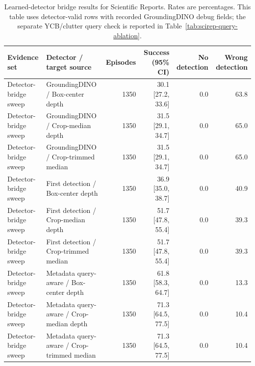\begin{table}[t]
\centering
\caption{Learned-detector bridge results for Scientific Reports. Rates are percentages. This table uses detector-valid rows with recorded GroundingDINO debug fields; the separate YCB/clutter query check is reported in Table~\ref{tab:scirep-query-ablation}.}
\label{tab:scirep-open-vocab-transfer}
\scriptsize
\begin{tabular}{llrrrr}
\toprule
Evidence set & Detector / target source & Episodes & Success (95\% CI) & No detection & Wrong detection \\
\midrule
Detector-bridge sweep & GroundingDINO / Box-center depth & 1350 & 30.1 [27.2, 33.6] & 0.0 & 63.8 \\
Detector-bridge sweep & GroundingDINO / Crop-median depth & 1350 & 31.5 [29.1, 34.7] & 0.0 & 65.0 \\
Detector-bridge sweep & GroundingDINO / Crop-trimmed median & 1350 & 31.5 [29.1, 34.7] & 0.0 & 65.0 \\
Detector-bridge sweep & First detection / Box-center depth & 1350 & 36.9 [35.0, 38.7] & 0.0 & 40.9 \\
Detector-bridge sweep & First detection / Crop-median depth & 1350 & 51.7 [47.8, 55.4] & 0.0 & 39.3 \\
Detector-bridge sweep & First detection / Crop-trimmed median & 1350 & 51.7 [47.8, 55.4] & 0.0 & 39.3 \\
Detector-bridge sweep & Metadata query-aware / Box-center depth & 1350 & 61.8 [58.3, 64.7] & 0.0 & 13.3 \\
Detector-bridge sweep & Metadata query-aware / Crop-median depth & 1350 & 71.3 [64.5, 77.5] & 0.0 & 10.4 \\
Detector-bridge sweep & Metadata query-aware / Crop-trimmed median & 1350 & 71.3 [64.5, 77.5] & 0.0 & 10.4 \\
\bottomrule
\end{tabular}
\end{table}
